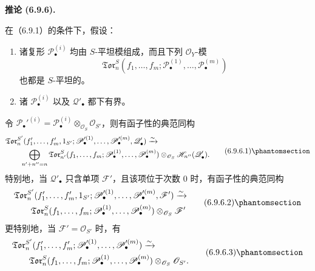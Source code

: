 \documentclass[UTF8,fontset=none,11pt,oneside,openany]{ctexbook}
\newenvironment{corollary}[1][]{%
  \par\medskip\noindent\textbf{推论 (#1).}\ %
}{\par}
\newcommand{\oldpage}[2][]{%
  \hypertarget{ega-source-page-#1-#2}{}%
  \marginnote{\scriptsize\textbf{#1}~|~#2}\ignorespaces}
\let\EGAOriginalLabel\label
\renewcommand{\label}[1]{\phantomsection\EGAOriginalLabel{#1}}
\begin{document}
\begin{corollary}[6.9.6]
在（6.9.1）的条件下，假设：
\begin{enumerate}
  \item[$1^\circ$] 诸复形 $\mathscr P_\bullet^{(i)}$ 均由
  $S$-平坦模组成，而且下列 $\mathscr O_Y$-模
  \[
    \mathfrak{Tor}_n^S
    (f_1,\ldots,f_m;
     \mathscr P_\bullet^{(1)},\ldots,\mathscr P_\bullet^{(m)})
  \]
  也都是 $S$-平坦的。
  \item[$2^\circ$] 诸 $\mathscr P_\bullet^{(i)}$ 以及
  $\mathscr Q'_\bullet$ 都下有界。
\end{enumerate}

\oldpage[III]{169}
令
$\mathscr P_\bullet'^{(i)}=
\mathscr P_\bullet^{(i)}\otimes_{\mathscr O_S}\mathscr O_{S'}$，则有函子性的典范同构
\[
\begin{split}
  &\mathfrak{Tor}_n^{S'}
  (f'_1,\ldots,f'_m,1_{S'};
   \mathscr P_\bullet'^{(1)},\ldots,
   \mathscr P_\bullet'^{(m)},\mathscr Q'_\bullet)
  \xrightarrow{\sim}\\
  &\qquad
  \bigoplus_{n'+n''=n}
  \mathfrak{Tor}_{n'}^S
  (f_1,\ldots,f_m;
   \mathscr P_\bullet^{(1)},\ldots,
   \mathscr P_\bullet^{(m)})
  \otimes_{\mathscr O_S}\mathscr H_{n''}(\mathscr Q'_\bullet).
\end{split}
\tag{6.9.6.1}\label{III.6.9.6.1.fr}
\]
特别地，当 $\mathscr Q'_\bullet$ 只含单项 $\mathscr F'$，且该项位于次数
$0$ 时，有函子性的典范同构
\[
\begin{split}
  &\mathfrak{Tor}_n^{S'}
  (f'_1,\ldots,f'_m,1_{S'};
   \mathscr P_\bullet'^{(1)},\ldots,
   \mathscr P_\bullet'^{(m)},\mathscr F')
  \xrightarrow{\sim}\\
  &\qquad
  \mathfrak{Tor}_n^S
  (f_1,\ldots,f_m;
   \mathscr P_\bullet^{(1)},\ldots,
   \mathscr P_\bullet^{(m)})
  \otimes_{\mathscr O_S}\mathscr F'
\end{split}
\tag{6.9.6.2}\label{III.6.9.6.2.fr}
\]
更特别地，当 $\mathscr F'=\mathscr O_{S'}$ 时，有
\[
\begin{split}
  &\mathfrak{Tor}_n^{S'}
  (f'_1,\ldots,f'_m;
   \mathscr P_\bullet'^{(1)},\ldots,
   \mathscr P_\bullet'^{(m)})
  \xrightarrow{\sim}\\
  &\qquad
  \mathfrak{Tor}_n^S
  (f_1,\ldots,f_m;
   \mathscr P_\bullet^{(1)},\ldots,
   \mathscr P_\bullet^{(m)})
  \otimes_{\mathscr O_S}\mathscr O_{S'}.
\end{split}
\tag{6.9.6.3}\label{III.6.9.6.3.fr}
\]
\end{corollary}
\end{document}
